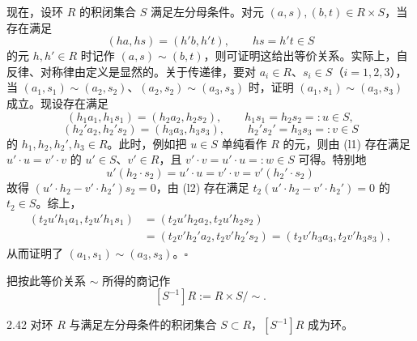 现在，设环 $R$ 的积闭集合 $S$ 满足左分母条件。对元 $(a,s),(b,t)\in R\times S$，当存在满足
\[
  (ha,hs)=(h'b,h't),\qquad hs=h't\in S
\]
的元 $h,h'\in R$ 时记作 $(a,s)\sim(b,t)$，则可证明这给出等价关系。实际上，自反律、对称律由定义是显然的。关于传递律，要对 $a_i\in R$、$s_i\in S$（$i=1,2,3$），当 $(a_1,s_1)\sim(a_2,s_2)$、$(a_2,s_2)\sim(a_3,s_3)$ 时，证明 $(a_1,s_1)\sim(a_3,s_3)$ 成立。现设存在满足
\[
  (h_1a_1,h_1s_1)=(h_2a_2,h_2s_2),\qquad h_1s_1=h_2s_2=:u\in S,
\]
\[
  (h_2'a_2,h_2's_2)=(h_3a_3,h_3s_3),\qquad h_2's_2'=h_3s_3=:v\in S
\]
的 $h_1,h_2,h_2',h_3\in R$。此时，例如把 $u\in S$ 单纯看作 $R$ 的元，则由 (l1) 存在满足 $u'\cdot u=v'\cdot v$ 的 $u'\in S$、$v'\in R$，且 $v'\cdot v=u'\cdot u=:w\in S$
可得。特别地
\[
  u'(h_2\cdot s_2)=u'\cdot u=v'\cdot v=v'(h_2'\cdot s_2)
\]
故得 $(u'\cdot h_2-v'\cdot h_2')s_2=0$，由 (l2) 存在满足 $t_2(u'\cdot h_2-v'\cdot h_2')=0$ 的 $t_2\in S$。综上，
\begin{align*}
  (t_2u'h_1a_1,t_2u'h_1s_1) &= (t_2u'h_2a_2,t_2u'h_2s_2)\\
  &= (t_2v'h_2'a_2,t_2v'h_2's_2) = (t_2v'h_3a_3,t_2v'h_3s_3),
\end{align*}
从而证明了 $(a_1,s_1)\sim(a_3,s_3)$。\hfill$\square$

把按此等价关系 $\sim$ 所得的商记作
\[
  [S^{-1}]R := R\times S/{\sim}.
\]

\begin{lemma}{2.42} 对环 $R$ 与满足左分母条件的积闭集合 $S\subset R$，$[S^{-1}]R$ 成为环。\end{lemma}

